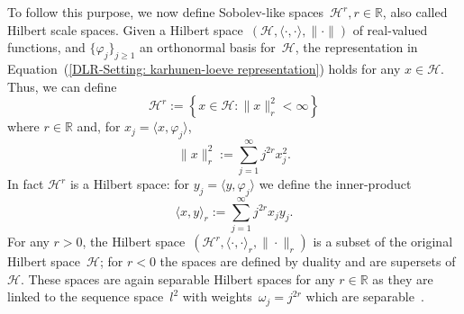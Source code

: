 To follow this purpose, we now define Sobolev-like spaces~$\mathcal{H}^r , r \in \mathbb{R}$, also called Hilbert scale spaces. Given a Hilbert space~$ (\mathcal{H}, \langle \cdot, \cdot \rangle, \| \cdot \|) $ of real-valued functions, and  $\{ \varphi_j \}_{j \geq 1}$ an orthonormal basis for~$\mathcal{H}$, the representation in Equation~(\ref{DLR-Setting: karhunen-loeve representation}) holds for any $x \in \mathcal{H}$. Thus, we can define
\begin{equation}
 \mathcal{H}^r := \left\{ x \in \mathcal{H}: \| x \|_r^2 < \infty \right\}
\end{equation}
where $r \in \mathbb{R}$ and, for $ x_j = \langle x, \varphi_j \rangle $,
\begin{equation}
\label{DLR-Setting: H^r norm}
 \| x \|_r^2 := \sum_{j=1}^{\infty} j^{2r} x_j^2.
\end{equation}
In fact $\mathcal{H}^r$ is a Hilbert space: for $ y_j = \langle y, \varphi_j \rangle $ we define the inner-product
\begin{equation}
 \langle x, y \rangle_{r} := \sum_{j=1}^{\infty} j^{2r} x_j y_j.
\end{equation}
For any $r>0$, the Hilbert space~$ (\mathcal{H}^r, \langle \cdot, \cdot \rangle_r, \| \cdot \|_r) $ is a subset of the original Hilbert space~$\mathcal{H}$; for $r<0$ the spaces are defined by duality and are supersets of $\mathcal{H}$. These spaces are again separable Hilbert spaces for any $r \in \mathbb{R}$ as they are linked to the sequence space~$l^2$ with weights~$\omega_j = j^{2r}$ which are separable~\autocite[Section 6.1.3]{Dashti2014}.

